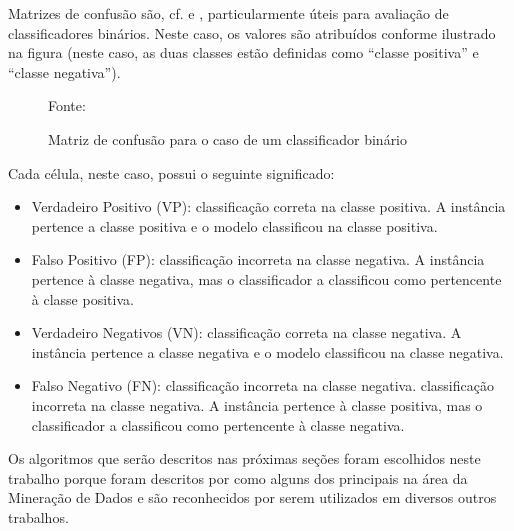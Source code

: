 Matrizes de confusão são, cf.  e , particularmente úteis para avaliação de classificadores binários. Neste caso, os valores são atribuídos conforme ilustrado na figura (neste caso, as duas classes estão definidas como ``classe positiva'' e ``classe negativa''). 

\begin{figure}[h!]
	\centering
	\caption{Matriz de confusão para o caso de um classificador binário}
	
	{\scriptsize Fonte: }
	\label{fig:binario_matriz_confusao}
\end{figure}

Cada célula, neste caso, possui o seguinte significado:

\begin{itemize}
	\item Verdadeiro Positivo (VP): classificação correta na classe positiva. A instância pertence a classe positiva e o modelo classificou na classe positiva.
	\item Falso Positivo (FP): classificação incorreta na classe negativa. A instância pertence à classe negativa, mas o classificador a classificou como pertencente à classe positiva.
	\item Verdadeiro Negativos (VN): classificação correta na classe negativa. A instância pertence a classe negativa e o modelo classificou na classe negativa.
	\item Falso Negativo (FN): classificação incorreta na classe negativa. classificação incorreta na classe negativa. A instância pertence à classe positiva, mas o classificador a classificou como pertencente à classe negativa. 
\end{itemize}

Os algoritmos que serão descritos nas próximas seções foram escolhidos neste trabalho porque foram descritos por  como alguns dos principais na área da Mineração de Dados e são reconhecidos por serem utilizados em diversos outros trabalhos.


